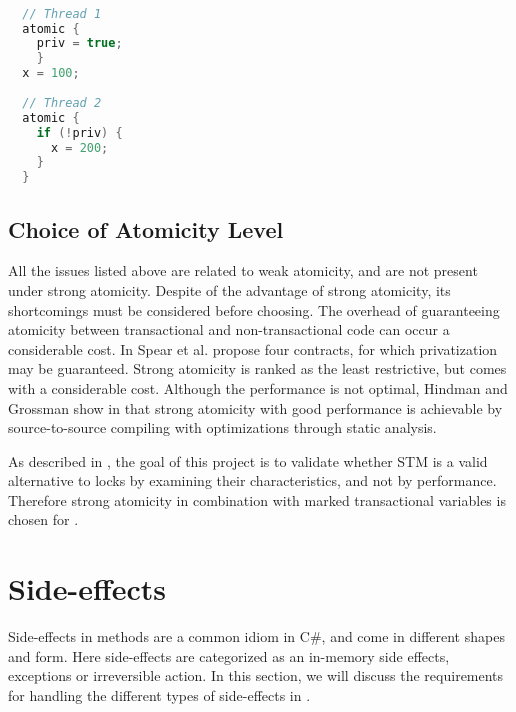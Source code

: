 \begin{lstlisting}[label=lst:privatization,
  caption={Privatization issue},
  language=Java,  
  showspaces=false,
  showtabs=false,
  breaklines=true,
  showstringspaces=false,
  breakatwhitespace=true,
  commentstyle=\color{greencomments},
  keywordstyle=\color{bluekeywords},
  stringstyle=\color{redstrings},
  morekeywords={atomic, retry, orElse, var, get, set}]  % Start your code-block

  // Thread 1
  atomic {
    priv = true;
    }
  x = 100;
  
  // Thread 2
  atomic {
    if (!priv) {
      x = 200;
    }
  }
\end{lstlisting}

\subsection{Choice of Atomicity Level}
All the issues listed above are related to weak atomicity, and are not present under strong atomicity. Despite of the advantage of strong atomicity, its shortcomings must be considered before choosing. The overhead of guaranteeing atomicity between transactional and non-transactional code can occur a considerable cost\cite{spear2007privatization}. In \cite{spear2007privatization} Spear et al. propose four contracts, for which privatization may be guaranteed. Strong atomicity is ranked as the least restrictive, but comes with a considerable cost. Although the performance is not optimal, Hindman and Grossman show in \cite{hindman2006atomicity} that strong atomicity with good performance is achievable by source-to-source compiling with optimizations through static analysis.

As described in , the goal of this project is to validate whether \ac{STM} is a valid alternative to locks by examining their characteristics, and not by performance. Therefore strong atomicity in combination with marked transactional variables is chosen for \stmname. 

\section{Side-effects}\label{sec:side-effects}
Side-effects in methods are a common idiom in C\#, and come in different shapes and form. Here side-effects are categorized as an in-memory side effects, exceptions or irreversible action. In this section, we will discuss the requirements for handling the different types of side-effects in \stmname.

